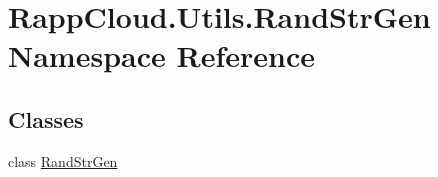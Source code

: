 \hypertarget{namespaceRappCloud_1_1Utils_1_1RandStrGen}{\section{Rapp\-Cloud.\-Utils.\-Rand\-Str\-Gen Namespace Reference}
\label{namespaceRappCloud_1_1Utils_1_1RandStrGen}
}
\subsection*{Classes}
\begin{DoxyCompactItemize}
\item 
class \hyperlink{classRappCloud_1_1Utils_1_1RandStrGen_1_1RandStrGen}{Rand\-Str\-Gen}
\end{DoxyCompactItemize}
